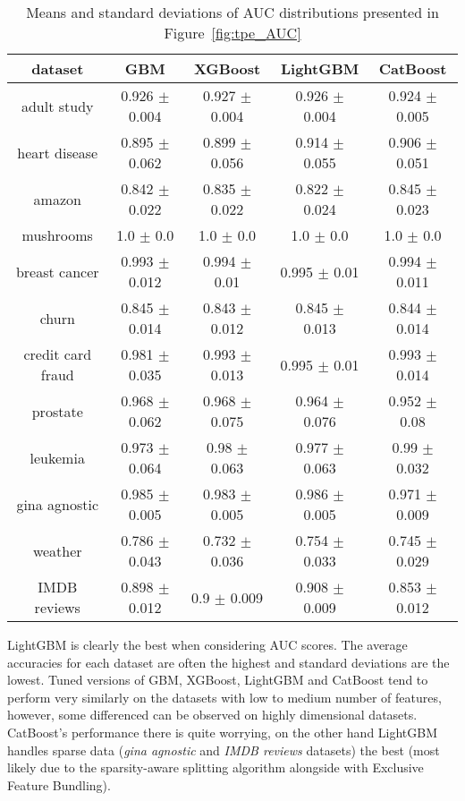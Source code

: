 \documentclass[magisterska, english]{pwr_wmat_praca_dyplomowa}
\theoremstyle{plain}
\numberwithin{theorem}{chapter}
\theoremstyle{definition}
\numberwithin{theorem}{chapter}
\begin{document}
\begin{table}[h!]
\centering
\begin{tabular}{|c|c|c|c|c|}
\hline
\textbf{dataset}  & \textbf{GBM}  & \textbf{XGBoost}  & \textbf{LightGBM}  & \textbf{CatBoost} \\ \hline
adult study & 0.926 $\pm$ 0.004 & \cellcolor{green}0.927 $\pm$ 0.004 & 0.926 $\pm$ 0.004 & \cellcolor{red}0.924 $\pm$ 0.005\\ \hline
heart disease & \cellcolor{red}0.895 $\pm$ 0.062 & 0.899 $\pm$ 0.056 & \cellcolor{green}0.914 $\pm$ 0.055 & 0.906 $\pm$ 0.051\\ \hline
amazon & 0.842 $\pm$ 0.022 & 0.835 $\pm$ 0.022 & \cellcolor{red}0.822 $\pm$ 0.024 & \cellcolor{green}0.845 $\pm$ 0.023\\ \hline
mushrooms & 1.0 $\pm$ 0.0 & 1.0 $\pm$ 0.0 & 1.0 $\pm$ 0.0 & 1.0 $\pm$ 0.0\\ \hline
breast cancer & \cellcolor{red}0.993 $\pm$ 0.012 & 0.994 $\pm$ 0.01 & \cellcolor{green}0.995 $\pm$ 0.01 & 0.994 $\pm$ 0.011\\ \hline
churn & 0.845 $\pm$ 0.014 & \cellcolor{red}0.843 $\pm$ 0.012 & \cellcolor{green}0.845 $\pm$ 0.013 & 0.844 $\pm$ 0.014\\ \hline
credit card fraud & \cellcolor{red}0.981 $\pm$ 0.035 & 0.993 $\pm$ 0.013 & \cellcolor{green}0.995 $\pm$ 0.01 & 0.993 $\pm$ 0.014\\ \hline
prostate & \cellcolor{green}0.968 $\pm$ 0.062 & 0.968 $\pm$ 0.075 & 0.964 $\pm$ 0.076 & \cellcolor{red}0.952 $\pm$ 0.08\\ \hline
leukemia & \cellcolor{red}0.973 $\pm$ 0.064 & 0.98 $\pm$ 0.063 & 0.977 $\pm$ 0.063 & \cellcolor{green}0.99 $\pm$ 0.032\\ \hline
gina agnostic & 0.985 $\pm$ 0.005 & 0.983 $\pm$ 0.005 & \cellcolor{green}0.986 $\pm$ 0.005 & \cellcolor{red}0.971 $\pm$ 0.009\\ \hline
weather & \cellcolor{green}0.786 $\pm$ 0.043 & \cellcolor{red}0.732 $\pm$ 0.036 & 0.754 $\pm$ 0.033 & 0.745 $\pm$ 0.029\\ \hline
IMDB reviews & 0.898 $\pm$ 0.012 & 0.9 $\pm$ 0.009 & \cellcolor{green}0.908 $\pm$ 0.009 & \cellcolor{red}0.853 $\pm$ 0.012\\ \hline
\end{tabular}
\caption{Means and standard deviations of AUC distributions presented in Figure~\ref{fig:tpe_AUC}}
\label{tab:tpe_AUC}
\end{table}

LightGBM is clearly the best when considering AUC scores. The average accuracies for each dataset are often the highest and standard deviations are the lowest. Tuned versions of GBM, XGBoost, LightGBM and CatBoost tend to perform very similarly on the datasets with low to medium number of features, however, some differenced can be observed on highly dimensional datasets. CatBoost's performance there is quite worrying, on the other hand LightGBM handles sparse data (\emph{gina agnostic} and \emph{IMDB reviews} datasets) the best (most likely due to the sparsity-aware splitting algorithm alongside with Exclusive Feature Bundling).
\end{document}
